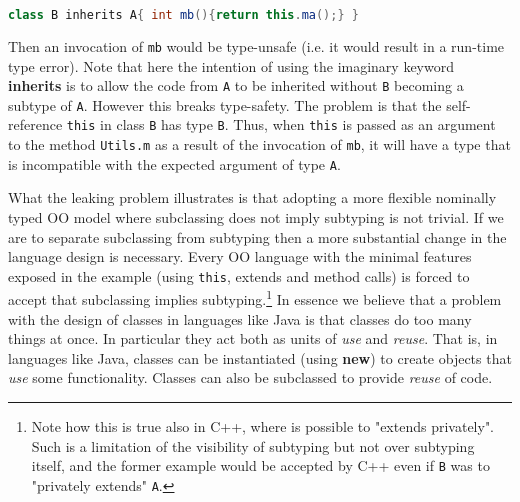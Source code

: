 \begin{lstlisting}[language=Java]
  class B inherits A{ int mb(){return this.ma();} }
\end{lstlisting}

\noindent Then an invocation of 
\lstinline{mb} would be type-unsafe (i.e. it would 
result in a run-time type error). 
Note that here the intention of using the imaginary keyword {\bf
  inherits} is to allow the code from \lstinline{A} to be inherited 
without \lstinline{B} becoming a subtype of \lstinline{A}. 
However this breaks type-safety. The problem is that the
self-reference \lstinline{this} in class \lstinline{B} has 
type \lstinline{B}. Thus, when \lstinline{this} is passed as an argument to 
the method \lstinline{Utils.m} as a result of the invocation of
\lstinline{mb}, it will have a type that is incompatible with the
expected argument of type \lstinline{A}.  

What the leaking problem illustrates is that
adopting a more flexible
nominally typed
OO model where subclassing does not imply subtyping is not trivial. 
If we are to separate subclassing from subtyping then a more substantial
change in the language design is necessary.  Every OO language with
the minimal features exposed in the example (using \lstinline{this},
extends and method calls) is forced to accept that subclassing implies
subtyping.\footnote{ Note how this is true also in C++, where is
  possible to "extends privately". Such is a limitation of the
  visibility of subtyping but not over subtyping itself, and the
  former example would be accepted by C++ even if \lstinline{B} was to
  "privately extends" \lstinline{A}.}
In essence we believe that a problem with the design of classes in languages like Java
is that classes do too many things at once. In particular they act
both as units of \emph{use} and \emph{reuse}.
That is, in languages like Java, classes can be
instantiated (using {\bf new}) to create objects that \emph{use} some 
functionality. Classes can also be subclassed to provide \emph{reuse}
of code.  



